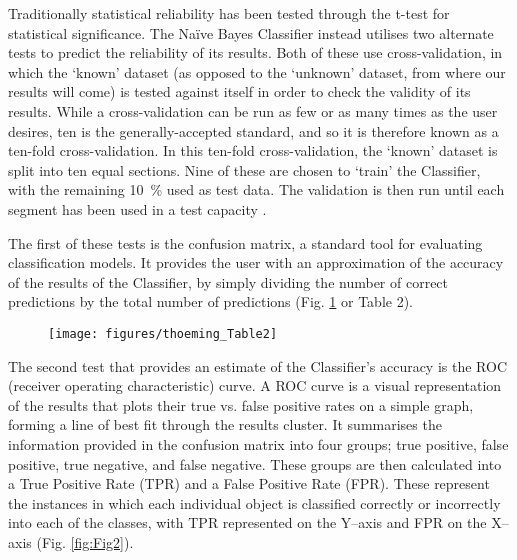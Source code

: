 	
	Traditionally statistical reliability has been tested through the t-test for statistical significance. The Naïve Bayes Classifier instead utilises two alternate tests to predict the reliability of its results. Both of these use cross-validation, in which the ‘known’ dataset (as opposed to the ‘unknown’ dataset, from where our results will come) is tested against itself in order to check the validity of its results. While a cross-validation can be run as few or as many times as the user desires, ten is the generally-accepted standard, and so it is therefore known as a ten-fold cross-validation. In this ten-fold cross-validation, the ‘known’ dataset is split into ten equal sections. Nine of these are chosen to ‘train’ the Classifier, with the remaining \SI{10}{\percent} used as test data. The validation is then run until each segment has been used in a test capacity \parencite[187]{Tan_2006}. 
	
	The first of these tests is the confusion matrix, a standard tool for evaluating classification models. It provides the user with an approximation of the accuracy of the results of the Classifier, by simply dividing the number of correct predictions by the total number of predictions \parencite[149]{Tan_2006}(Fig. \ref{fig:Table2} or Table 2).
	
		\begin{figure}[!htb]
			\texttt{[image: figures/thoeming\_Table2]}
			\centering
			\label{fig:Table2}
		\end{figure}	
	The second test that provides an estimate of the Classifier’s accuracy is the ROC (receiver operating characteristic) curve. A ROC curve is a visual representation of the results that plots their true vs. false positive rates on a simple graph, forming a line of best fit through the results cluster. It summarises the information provided in the confusion matrix into four groups; true positive, false positive, true negative, and false negative. These groups are then calculated into a True Positive Rate (TPR) and a False Positive Rate (FPR). These represent the instances in which each individual object is classified correctly or incorrectly into each of the classes, with TPR represented on the Y–axis and FPR on the X–axis \parencite[298--301]{Tan_2006}(Fig. \ref{fig:Fig2}).
	
